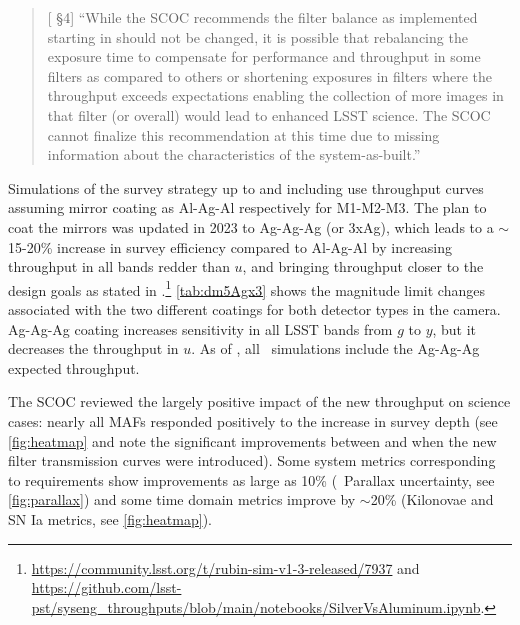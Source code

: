  \begin{quote}
    {[ \S4] ``While the SCOC recommends the filter balance as implemented starting in  should not be changed, it is possible that rebalancing the exposure time to compensate for performance and throughput in some filters as compared to others or shortening exposures in filters where the throughput exceeds expectations enabling the collection of more images in that filter (or overall) would lead to enhanced LSST science. The SCOC cannot finalize this recommendation at this time due to missing information about the characteristics of the system-as-built.''}
\end{quote}

Simulations of the survey strategy up to and including  use throughput curves assuming mirror coating as Al-Ag-Al respectively for M1-M2-M3. The plan to coat the mirrors was updated in 2023 to Ag-Ag-Ag (or 3xAg), which leads to a $\sim$15-20\% increase in survey efficiency compared to Al-Ag-Al by increasing throughput in all bands redder than $u$, and bringing throughput closer to the design goals as stated in .\footnote{\url{https://community.lsst.org/t/rubin-sim-v1-3-released/7937} and \url{https://github.com/lsst-pst/syseng_throughputs/blob/main/notebooks/SilverVsAluminum.ipynb}.}  \autoref{tab:dm5Agx3} shows the magnitude limit changes associated with the two different coatings for both detector types in the camera.  Ag-Ag-Ag coating increases sensitivity in all LSST bands from $g$ to $y$, but it decreases the throughput in $u$.  As of , all \opsim\ simulations include the Ag-Ag-Ag expected throughput.

The SCOC reviewed the largely positive impact of the new throughput on science cases: nearly all MAFs responded positively to the increase in survey depth (see \autoref{fig:heatmap} and note the significant improvements between  and  when the new filter transmission curves were introduced). Some system metrics corresponding to  requirements show improvements as large as 10\% (\eg\ Parallax uncertainty, see \autoref{fig:parallax}) and some time domain metrics improve by $\sim$20\% (Kilonovae and SN Ia metrics, see \autoref{fig:heatmap}). 
\clearpage

